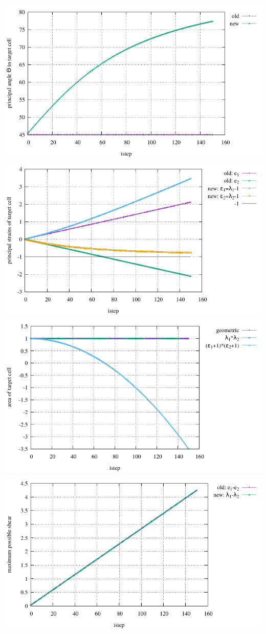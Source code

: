 \begin{center}
\includegraphics[width=9.cm]{python_codes/fieldstone_89/results/shearband/principal_angle.pdf}
\includegraphics[width=9.cm]{python_codes/fieldstone_89/results/shearband/principal_strains.pdf}\\
\includegraphics[width=9.cm]{python_codes/fieldstone_89/results/shearband/area.pdf}
\includegraphics[width=9.cm]{python_codes/fieldstone_89/results/shearband/maximum_shear.pdf}\\

\end{center}
